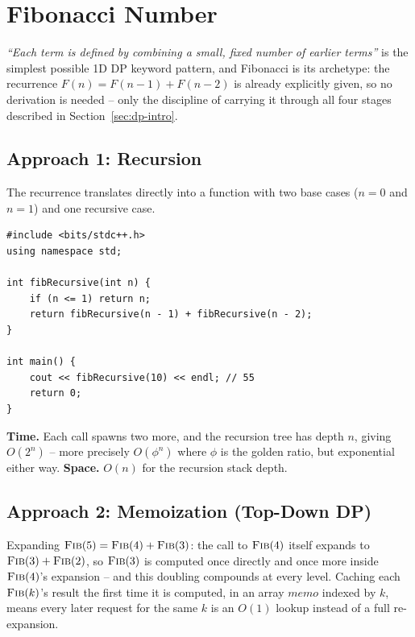 \section{Fibonacci Number}
\label{sec:dp-fibonacci}


\begin{patternbox}
\emph{``Each term is defined by combining a small, fixed number of
earlier terms''} is the simplest possible 1D DP keyword pattern, and
Fibonacci is its archetype: the recurrence $F(n) = F(n-1)+F(n-2)$ is
already explicitly given, so no derivation is needed -- only the
discipline of carrying it through all four stages described in
Section~\ref{sec:dp-intro}.
\end{patternbox}

\subsection*{Approach 1: Recursion}

The recurrence translates directly into a function with two base cases
($n=0$ and $n=1$) and one recursive case.

\begin{lstlisting}
#include <bits/stdc++.h>
using namespace std;

int fibRecursive(int n) {
    if (n <= 1) return n;
    return fibRecursive(n - 1) + fibRecursive(n - 2);
}

int main() {
    cout << fibRecursive(10) << endl; // 55
    return 0;
}
\end{lstlisting}

\begin{complexitybox}
\textbf{Time.} Each call spawns two more, and the recursion tree has
depth $n$, giving $O(2^n)$ -- more precisely $O(\phi^n)$ where $\phi$ is
the golden ratio, but exponential either way.
\textbf{Space.} $O(n)$ for the recursion stack depth.
\end{complexitybox}

\subsection*{Approach 2: Memoization (Top-Down DP)}

\begin{ideabox}
Expanding $\textsc{Fib}(5) = \textsc{Fib}(4) + \textsc{Fib}(3)$: the call
to $\textsc{Fib}(4)$ itself expands to $\textsc{Fib}(3)+\textsc{Fib}(2)$,
so $\textsc{Fib}(3)$ is computed once directly and once more inside
$\textsc{Fib}(4)$'s expansion -- and this doubling compounds at every
level. Caching each $\textsc{Fib}(k)$'s result the first time it is
computed, in an array $\textit{memo}$ indexed by $k$, means every later
request for the same $k$ is an $O(1)$ lookup instead of a full
re-expansion.
\end{ideabox}

